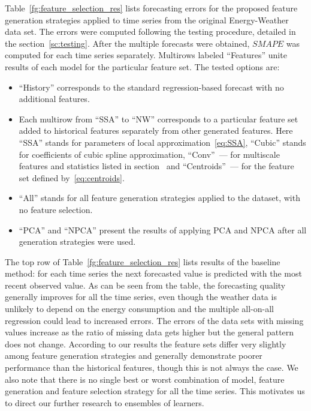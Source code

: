 \documentclass[conference]{IEEEtran}
\begin{document}
Table~\ref{fg:feature_selection_res} lists forecasting errors for the proposed feature generation strategies applied to time series from the original Energy-Weather data set. The errors were computed following the testing procedure, detailed in the section~\ref{sc:testing}. After the multiple forecasts were obtained, $SMAPE$ was computed for each time series separately. Multirows labeled ``Features'' unite results of each model for the particular feature set. The tested options are:
\begin{itemize}
\item ``History'' corresponds to the standard regression-based forecast with no additional features.
\item Each multirow from ``SSA'' to ``NW''  corresponds to a particular feature set added to historical features separately from other generated features. Here ``SSA'' stands for parameters of local approximation~\eqref{eq:SSA}, ``Cubic'' stands for coefficients of cubic spline approximation, ``Conv''~--- for multiscale features and statistics listed in section~\label{sc:Conv} and ``Centroids''~--- for the feature set defined by~\eqref{eq:centroids}.
\item ``All'' stands for all feature generation strategies applied to the dataset, with no feature selection.
\item  ``PCA'' and ``NPCA'' present the results of applying PCA and NPCA after all generation strategies were used.
\end{itemize}
The top row of Table~\ref{fg:feature_selection_res} lists results of the baseline method: for each time series the next forecasted value is predicted with the most recent observed value. As can be seen from the table, the forecasting quality generally improves for all the time series, even though the weather data is unlikely to depend on the energy consumption and the multiple all-on-all regression could lead to increased errors. The errors of the data sets with missing values increase as the ratio of missing data gets higher but the general pattern does not change.  According to our results the feature sets differ very slightly among feature generation strategies and generally demonstrate poorer performance than the historical features, though this is not always the case. We also note that there is no single best or worst combination of model, feature generation and feature selection strategy for all the time series. This motivates us to direct our further research to ensembles of learners.
\end{document}
